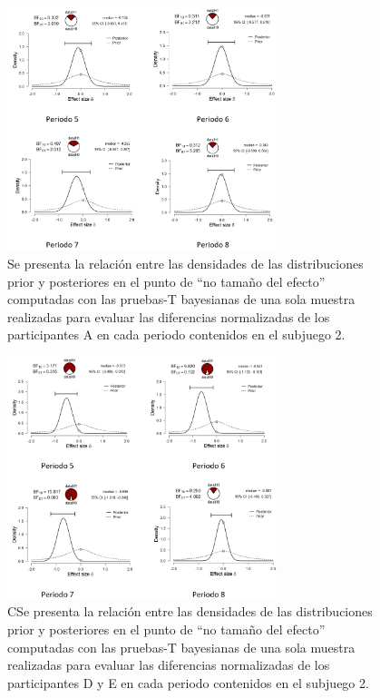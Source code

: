 \begin{figure}[th]
\centering
\includegraphics[width=0.70\textwidth]{Figures/Fig_9} 
\caption[Cambio en el número elegido periodo a periodo.]{Se presenta la relación entre las densidades de las distribuciones prior y posteriores en el punto de “no tamaño del efecto” computadas con las pruebas-T bayesianas de una sola muestra realizadas para evaluar las diferencias normalizadas de los participantes A en cada periodo contenidos en el subjuego 2.}
\label{fig:DiferenciasNormalizadas_Subjuego2_A}
\end{figure}

\begin{figure}[th]
\centering
\includegraphics[width=0.70\textwidth]{Figures/Fig_10} 
\caption[Cambio en el número elegido periodo a periodo.]{CSe presenta la relación entre las densidades de las distribuciones prior y posteriores en el punto de “no tamaño del efecto” computadas con las pruebas-T bayesianas de una sola muestra realizadas para evaluar las diferencias normalizadas de los participantes D y E en cada periodo contenidos en el subjuego 2.}
\label{fig:DiferenciasNormalizadas_Subjuego2_DE}
\end{figure}

